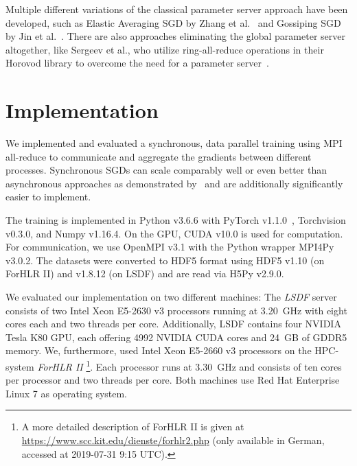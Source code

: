\documentclass[conference]{IEEEtran}
\begin{document}
Multiple different variations of the classical parameter server approach have been developed, such as Elastic Averaging SGD by Zhang et al.~\cite{zhang2015-Elastic-AvgSGD} and Gossiping SGD by Jin et al.~\cite{jin2016-How-to-scale}.
There are also approaches eliminating the global parameter server altogether, like Sergeev et al., who utilize ring-all-reduce operations in their Horovod library to overcome the need for a parameter server~\cite{sergeev2018horovod}.






\section{Implementation} %
\label{sec:implementation}
We implemented and evaluated a synchronous, data parallel training using MPI all-reduce to communicate and aggregate the gradients between different processes.
Synchronous SGDs can scale comparably well or even better than asynchronous approaches as demonstrated by~\cite{jin2016-How-to-scale,chen2016-Revisiting-distributed-synchronous-SGD} and are additionally significantly easier to implement.

The training is implemented in Python v3.6.6 with PyTorch v1.1.0~\cite{paszke2017automatic}, Torchvision v0.3.0, and Numpy v1.16.4.
On the GPU, CUDA v10.0 is used for computation.
For communication, we use OpenMPI v3.1 with the Python wrapper MPI4Py v3.0.2.
The datasets were converted to HDF5 format using HDF5 v1.10 (on ForHLR II) and v1.8.12 (on LSDF) and are read via H5Py v2.9.0.

We evaluated our implementation on two different machines:
The \emph{LSDF} server consists of two Intel Xeon E5-2630 v3 processors running at 3.20~GHz with eight cores each and two threads per core.
Additionally, LSDF contains four NVIDIA Tesla K80 GPU, each offering 4992 NVIDIA CUDA cores and 24~GB of GDDR5 memory.
%
We, furthermore, used Intel Xeon E5-2660 v3 processors on the HPC-system \emph{ForHLR II}
\footnote{A more detailed description of ForHLR II is given at \url{https://www.scc.kit.edu/dienste/forhlr2.php} (only available in German, accessed at 2019-07-31 9:15 UTC).}.
Each processor runs at 3.30~GHz and consists of ten cores per processor and two threads per core.
%
Both machines use Red Hat Enterprise Linux 7 as operating system.
\end{document}
